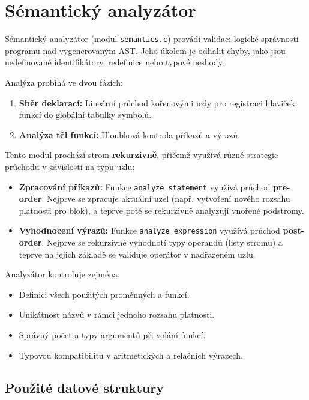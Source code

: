 \section{Sémantický analyzátor}

Sémantický analyzátor (modul \texttt{semantics.c}) provádí validaci logické správnosti programu nad vygenerovaným AST. Jeho úkolem je odhalit chyby, jako jsou nedefinované identifikátory, redefinice nebo typové neshody.

Analýza probíhá ve dvou fázích:
\begin{enumerate}
    \item \textbf{Sběr deklarací:} Lineární průchod kořenovými uzly pro registraci hlaviček funkcí do globální tabulky symbolů.
    \item \textbf{Analýza těl funkcí:} Hloubková kontrola příkazů a výrazů.
\end{enumerate}

Tento modul prochází strom \textbf{rekurzivně}, přičemž využívá různé strategie průchodu v závislosti na typu uzlu:

\begin{itemize}
    \item \textbf{Zpracování příkazů:} Funkce \texttt{analyze\_statement} využívá průchod \textbf{pre-order}. Nejprve se zpracuje aktuální uzel (např. vytvoření nového rozsahu platnosti pro blok), a teprve poté se rekurzivně analyzují vnořené podstromy.
    
    \item \textbf{Vyhodnocení výrazů:} Funkce \texttt{analyze\_expression} využívá průchod \textbf{post-order}. Nejprve se rekurzivně vyhodnotí typy operandů (listy stromu) a teprve na jejich základě se validuje operátor v nadřazeném uzlu.
\end{itemize}

Analyzátor kontroluje zejména:
\begin{itemize}
    \item Definici všech použitých proměnných a funkcí.
    \item Unikátnost názvů v rámci jednoho rozsahu platnosti.
    \item Správný počet a typy argumentů při volání funkcí.
    \item Typovou kompatibilitu v aritmetických a relačních výrazech.
\end{itemize}

\subsection*{Použité datové struktury}

